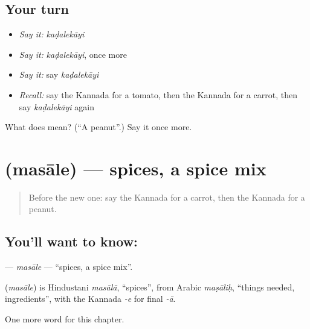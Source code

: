 \subsection*{Your turn}
\begin{itemize}
\raggedright
  \item \emph{Say it:} \emph{kaḍalekāyi}
  \item \emph{Say it:} \emph{kaḍalekāyi}, once more
  \item \emph{Say it:} say \emph{kaḍalekāyi}
  \item \emph{Recall:} say the Kannada for a tomato, then the Kannada for a carrot, then say \emph{kaḍalekāyi} again
\end{itemize}

\begin{tcolorbox}[breakable,colback=teal!4,colframe=teal!35!black,title={Before you move on}]
What does  mean? (\textquotedblleft{}A peanut\textquotedblright{}.) Say it once more.
\end{tcolorbox}
\section[\texorpdfstring{\kn{ಮಸಾಲೆ} (masāle)}{ಮಸಾಲೆ (masāle)}]{ (masāle) — spices, a spice mix}

\label{lesson:KA-C294-masale}



\begin{quote}
Before the new one: say the Kannada for a carrot, then the Kannada for a peanut.
\end{quote}

\subsection*{You'll want to know: }
\textbf{} — \emph{masāle} — \textquotedblleft{}spices, a spice mix\textquotedblright{}.

\begin{cousinweb}
\textbf{} (\emph{masāle}) is Hindustani \emph{masālā}, \textquotedblleft{}spices\textquotedblright{}, from Arabic \emph{maṣāliḥ}, \textquotedblleft{}things needed, ingredients\textquotedblright{}, with the Kannada \emph{-e} for final \emph{-ā}.
\end{cousinweb}

\begin{grammarlens}[title={What you've built}]
One more word for this chapter.
\end{grammarlens}

